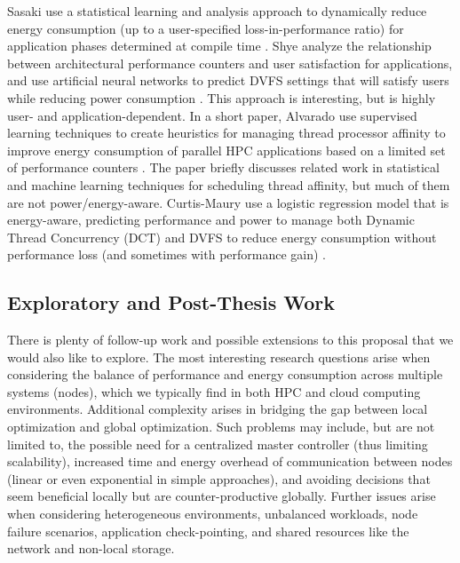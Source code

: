 Sasaki \etal use a statistical learning and analysis approach to dynamically reduce energy consumption (up to a user-specified loss-in-performance ratio) for application phases determined at compile time \cite{Sasaki}.
Shye \etal analyze the relationship between architectural performance counters and user satisfaction for applications, and use artificial neural networks to predict DVFS settings that will satisfy users while reducing power consumption \cite{ShyeIDVFS}.
This approach is interesting, but is highly user- and application-dependent.
In a short paper, Alvarado \etal use supervised learning techniques to create heuristics for managing thread processor affinity to improve energy consumption of parallel HPC applications based on a limited set of performance counters \cite{Alvarado}.
The paper briefly discusses related work in statistical and machine learning techniques for scheduling thread affinity, but much of them are not power/energy-aware.
Curtis-Maury \etal use a logistic regression model that is energy-aware, predicting performance and power to manage both Dynamic Thread Concurrency (DCT) and DVFS to reduce energy consumption without performance loss (and sometimes with performance gain) \cite{Curtis-Maury2008}.


\subsection{Exploratory and Post-Thesis Work}

There is plenty of follow-up work and possible extensions to this proposal that we would also like to explore.
The most interesting research questions arise when considering the balance of performance and energy consumption across multiple systems (nodes), which we typically find in both HPC and cloud computing environments.
Additional complexity arises in bridging the gap between local optimization and global optimization.
Such problems may include, but are not limited to, the possible need for a centralized master controller (thus limiting scalability), increased time and energy overhead of communication between nodes (linear or even exponential in simple approaches), and avoiding decisions that seem beneficial locally but are counter-productive globally.
Further issues arise when considering heterogeneous environments, unbalanced workloads, node failure scenarios, application check-pointing, and shared resources like the network and non-local storage.
